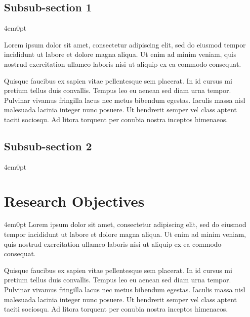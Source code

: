 	\subsection{Subsub-section 1}
		\begin{indentedblock}{4em}{0pt}
			
			Lorem ipsum dolor sit amet, consectetur adipiscing elit, sed do eiusmod tempor incididunt ut labore et dolore magna aliqua. Ut enim ad minim veniam, quis nostrud exercitation ullamco laboris nisi ut aliquip ex ea commodo consequat. 
			
			
			Quisque faucibus ex sapien vitae pellentesque sem placerat. In id cursus mi pretium tellus duis convallis. Tempus leo eu aenean sed diam urna tempor. Pulvinar vivamus fringilla lacus nec metus bibendum egestas. Iaculis massa nisl malesuada lacinia integer nunc posuere. Ut hendrerit semper vel class aptent taciti sociosqu. Ad litora torquent per conubia nostra inceptos himenaeos.
		\end{indentedblock}
		
	\subsection{Subsub-section 2}
		\begin{indentedblock}{4em}{0pt}
		\end{indentedblock}

\section{Research Objectives}
	\begin{indentedblock}{4em}{0pt}
		\fontsize{12pt}{\baselineskip}\selectfont
		Lorem ipsum dolor sit amet, consectetur adipiscing elit, sed do eiusmod tempor incididunt ut labore et dolore magna aliqua. Ut enim ad minim veniam, quis nostrud exercitation ullamco laboris nisi ut aliquip ex ea commodo consequat. 
		
		
		Quisque faucibus ex sapien vitae pellentesque sem placerat. In id cursus mi pretium tellus duis convallis. Tempus leo eu aenean sed diam urna tempor. Pulvinar vivamus fringilla lacus nec metus bibendum egestas. Iaculis massa nisl malesuada lacinia integer nunc posuere. Ut hendrerit semper vel class aptent taciti sociosqu. Ad litora torquent per conubia nostra inceptos himenaeos.
	\end{indentedblock}

